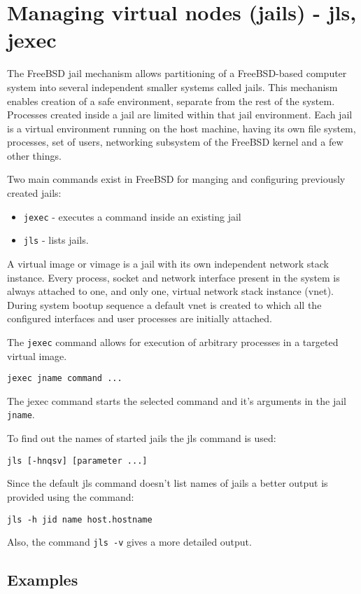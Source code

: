 \section{Managing virtual nodes (jails) - jls, jexec}
The FreeBSD jail mechanism allows partitioning of a FreeBSD-based computer
system into several independent smaller systems called jails. This mechanism
enables creation of a safe environment, separate from the rest of the system.
Processes created inside a jail are limited within that jail environment. Each
jail is a virtual environment running on the host machine, having its own file
system, processes, set of users, networking subsystem of the FreeBSD kernel and
a few other things.     

Two main commands exist in FreeBSD for manging and configuring previously
created jails:
\begin{itemize}
\item \texttt{jexec} - executes a command inside an existing jail
\item \texttt{jls} - lists jails.
\end{itemize}

A virtual image or vimage is a jail with its own independent network stack
instance.  Every process, socket and network interface present in the system is
always attached to one, and only one, virtual network stack instance (vnet).
During system bootup sequence a default vnet is created to which all the
configured interfaces and user processes are initially attached. 

The \texttt{jexec} command allows for execution of arbitrary processes in a
targeted virtual image.

\texttt{jexec jname command ...} \hfill

The jexec command starts the selected command and it's arguments in the jail
\texttt{jname}.

To find out the names of started jails the jls command is used: 

\texttt{jls [-hnqsv] [parameter ...]} \hfill
 
Since the default jls command doesn't list names of jails a better output is
provided using the command:

\texttt{jls -h jid name host.hostname} \hfill

Also, the command \texttt{jls -v} gives a more detailed output.

\subsection{Examples}

